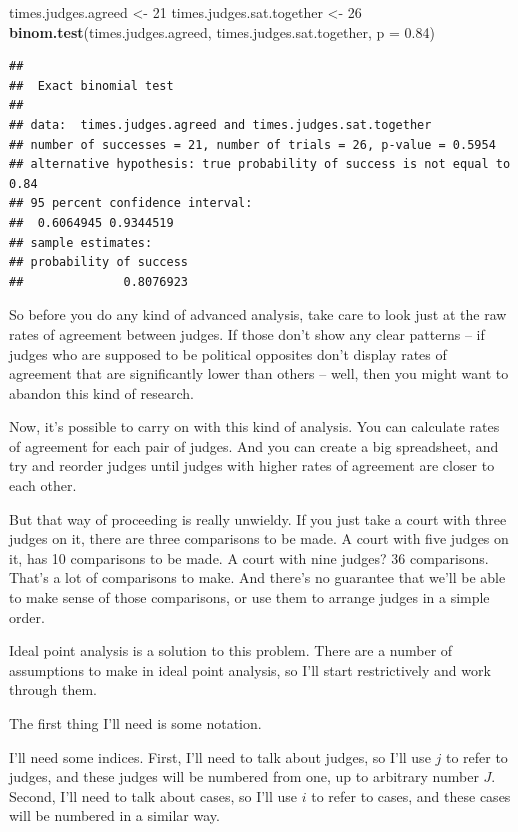 \documentclass[12pt,twoside]{article}
\newenvironment{Shaded}{}{}
\newcommand{\KeywordTok}[1]{\textcolor[rgb]{0.00,0.44,0.13}{\textbf{{#1}}}}
\newcommand{\DataTypeTok}[1]{\textcolor[rgb]{0.56,0.13,0.00}{{#1}}}
\newcommand{\DecValTok}[1]{\textcolor[rgb]{0.25,0.63,0.44}{{#1}}}
\newcommand{\FloatTok}[1]{\textcolor[rgb]{0.25,0.63,0.44}{{#1}}}
\newcommand{\StringTok}[1]{\textcolor[rgb]{0.25,0.44,0.63}{{#1}}}
\newcommand{\NormalTok}[1]{{#1}}
\begin{document}
\begin{Shaded}
\begin{Highlighting}[]
\NormalTok{times.judges.agreed <-}\StringTok{ }\DecValTok{21}
\NormalTok{times.judges.sat.together <-}\StringTok{ }\DecValTok{26}
\KeywordTok{binom.test}\NormalTok{(times.judges.agreed,}
           \NormalTok{times.judges.sat.together,}
           \DataTypeTok{p =} \FloatTok{0.84}\NormalTok{)}
\end{Highlighting}
\end{Shaded}

\begin{verbatim}
## 
##  Exact binomial test
## 
## data:  times.judges.agreed and times.judges.sat.together
## number of successes = 21, number of trials = 26, p-value = 0.5954
## alternative hypothesis: true probability of success is not equal to 0.84
## 95 percent confidence interval:
##  0.6064945 0.9344519
## sample estimates:
## probability of success 
##              0.8076923
\end{verbatim}

So before you do any kind of advanced analysis, take care to look just
at the raw rates of agreement between judges. If those don't show any
clear patterns -- if judges who are supposed to be political opposites
don't display rates of agreement that are significantly lower than
others -- well, then you might want to abandon this kind of research.

Now, it's possible to carry on with this kind of analysis. You can
calculate rates of agreement for each pair of judges. And you can create
a big spreadsheet, and try and reorder judges until judges with higher
rates of agreement are closer to each other.

But that way of proceeding is really unwieldy. If you just take a court
with three judges on it, there are three comparisons to be made. A court
with five judges on it, has 10 comparisons to be made. A court with nine
judges? 36 comparisons. That's a lot of comparisons to make. And there's
no guarantee that we'll be able to make sense of those comparisons, or
use them to arrange judges in a simple order.

Ideal point analysis is a solution to this problem. There are a number
of assumptions to make in ideal point analysis, so I'll start
restrictively and work through them.

The first thing I'll need is some notation.

I'll need some indices. First, I'll need to talk about judges, so I'll
use \(j\) to refer to judges, and these judges will be numbered from
one, up to arbitrary number \(J\). Second, I'll need to talk about
cases, so I'll use \(i\) to refer to cases, and these cases will be
numbered in a similar way.
\end{document}
